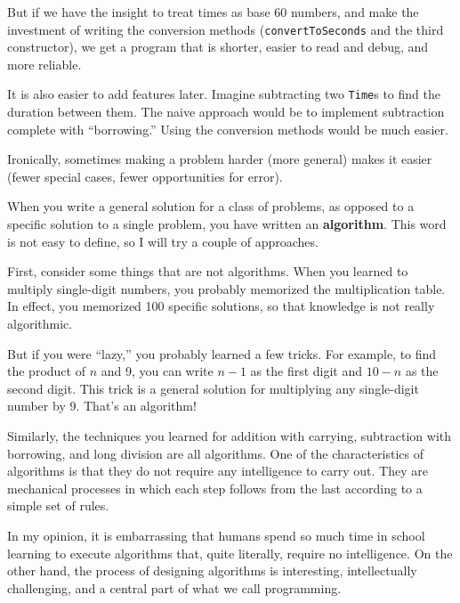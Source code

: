 But if we have the insight to treat times as base 60 numbers,
and make the investment of writing the conversion methods
({\tt convertToSeconds} and the third constructor), we get
a program that is shorter, easier to read and debug, and more
reliable.

It is also easier to add features later.  Imagine
subtracting two {\tt Time}s to find the duration between them.  The
naive approach would be to implement subtraction complete with
``borrowing.''  Using the conversion methods would be much easier.

Ironically, sometimes making a problem harder (more general)
makes it easier (fewer special cases, fewer opportunities for error).




When you write a general solution for a class of problems, as
opposed to a specific solution to a single problem, you have
written an {\bf algorithm}.  This word is
not easy to define, so I will try a couple of approaches.

First, consider some things that are not algorithms.  When you learned
to multiply single-digit numbers, you probably memorized the
multiplication table.  In effect, you memorized 100 specific
solutions, so that knowledge is not really algorithmic.

But if you were ``lazy,'' you probably learned a few
tricks.  For example, to find the product of $n$ and 9, you can
write $n-1$ as the first digit and $10-n$ as the second digit.  This
trick is a general solution for multiplying any single-digit number by 9.
That's an algorithm!

Similarly, the techniques you learned for addition with carrying,
subtraction with borrowing, and long division are all algorithms.  One
of the characteristics of algorithms is that they do not require any
intelligence to carry out.  They are mechanical processes in which
each step follows from the last according to a simple set of rules.

In my opinion, it is embarrassing that humans spend so much
time in school learning to execute algorithms that,
quite literally, require no intelligence.
%
On the other hand, the process of designing algorithms is
interesting, intellectually challenging, and a central part
of what we call programming.

